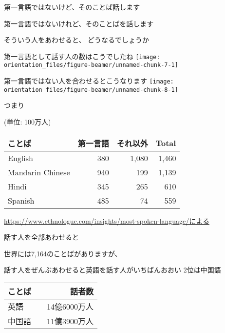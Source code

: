 \documentclass[
  ignorenonframetext,
  aspectratio=169,
  xcolor=dvipsnames]{beamer}
\begin{document}
\begin{frame}{第一言語ではないけど、そのことば話します}
\label{ux7b2cux4e00ux8a00ux8a9eux3067ux306fux306aux3044ux3051ux3069ux305dux306eux3053ux3068ux3070ux8a71ux3057ux307eux3059}
\Large

第一言語ではないけれど、そのことばを話します

そういう人をあわせると、 どうなるでしょうか
\end{frame}

\begin{frame}{第一言語として話す人の数はこうでしたね}
\label{ux7b2cux4e00ux8a00ux8a9eux3068ux3057ux3066ux8a71ux3059ux4ebaux306eux6570ux306fux3053ux3046ux3067ux3057ux305fux306d}
\texttt{[image: orientation\_files/figure-beamer/unnamed-chunk-7-1]}
\end{frame}

\begin{frame}{第一言語ではない人を合わせるとこうなります}
\label{ux7b2cux4e00ux8a00ux8a9eux3067ux306fux306aux3044ux4ebaux3092ux5408ux308fux305bux308bux3068ux3053ux3046ux306aux308aux307eux3059}
\texttt{[image: orientation\_files/figure-beamer/unnamed-chunk-8-1]}
\end{frame}

\begin{frame}{つまり}
\label{ux3064ux307eux308a}
\raggedleft

(単位: 100万人)

\vfill

\Large

\begin{tabular}{lrrr}
\toprule
ことば & 第一言語 & それ以外 & Total\\
\midrule
English & 380 & 1,080 & 1,460\\
Mandarin Chinese & 940 & 199 & 1,139\\
Hindi & 345 & 265 & 610\\
Spanish & 485 & 74 & 559\\
\bottomrule
\end{tabular}

\vfill

\scriptsize

\url{https://www.ethnologue.com/insights/most-spoken-language/による}
\end{frame}

\begin{frame}{話す人を全部あわせると}
\label{ux8a71ux3059ux4ebaux3092ux5168ux90e8ux3042ux308fux305bux308bux3068}
\Large

世界には7,164のことばがありますが、

話す人をぜんぶあわせると\pause 英語を話す人がいちばんおおい\pause
2位は中国語\pause

\centering
\vfill

\begin{tabular}{lr}\toprule
ことば&話者数\\
\midrule
英語&14億6000万人\\
中国語　&11億3900万人\\
\bottomrule
\end{tabular}
\end{frame}
\end{document}
